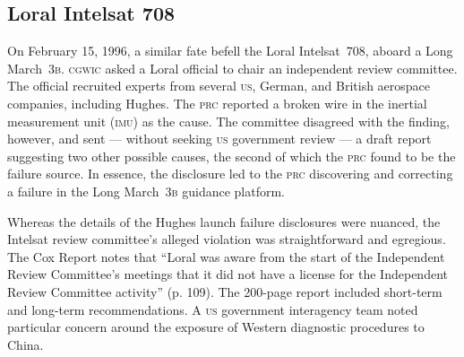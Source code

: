 \documentclass[preprint,twocolumn,5p]{elsarticle}
\begin{document}
\subsection{Loral Intelsat 708}
On February 15, 1996, a similar fate befell the Loral Intelsat~708, aboard a Long March~\textsc{3b}. \textsc{cgwic} asked a Loral official to chair an independent review committee. The official recruited experts from several \textsc{us}, German, and British aerospace companies, including Hughes. The \textsc{prc} reported a broken wire in the inertial measurement unit (\textsc{imu}) as the cause. The committee disagreed with the finding, however, and sent --- without seeking \textsc{us} government review --- a draft report suggesting two other possible causes, the second of which the \textsc{prc} found to be the failure source. In essence, the disclosure led to the \textsc{prc} discovering and correcting a failure in the Long March~\textsc{3b} guidance platform. \citep{Cox1999}

Whereas the details of the Hughes launch failure disclosures were nuanced, the Intelsat review committee's alleged violation was straightforward and egregious. The Cox Report notes that ``Loral was aware from the start of the Independent Review Committee's meetings that it did not have a license for the Independent Review Committee activity'' (p. 109). The 200-page report included short-term and long-term recommendations. A \textsc{us} government interagency team noted particular concern around the exposure of Western diagnostic procedures to China. \citep{Cox1999}
\end{document}

